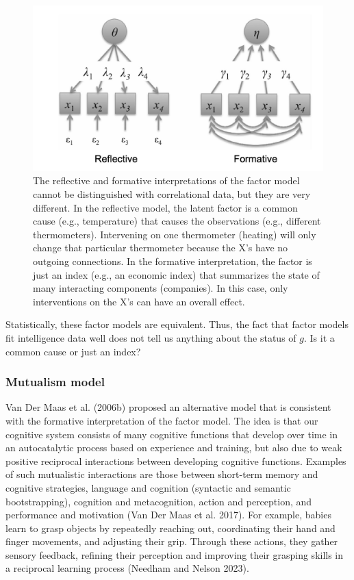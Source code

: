 \documentclass[
  a4paper,
  DIV=11,
  numbers=noendperiod]{scrreprt}
\begin{document}
\begin{figure}

{\centering \includegraphics{media/ch6/image5.jpg}

}

\caption{\label{fig-ch6-img5-old-74}The reflective and formative
interpretations of the factor model cannot be distinguished with
correlational data, but they are very different. In the reflective
model, the latent factor is a common cause (e.g., temperature) that
causes the observations (e.g., different thermometers). Intervening on
one thermometer (heating) will only change that particular thermometer
because the X's have no outgoing connections. In the formative
interpretation, the factor is just an index (e.g., an economic index)
that summarizes the state of many interacting components (companies). In
this case, only interventions on the X's can have an overall effect.}

\end{figure}

Statistically, these factor models are equivalent. Thus, the fact that
factor models fit intelligence data well does not tell us anything about
the status of \(g\). Is it a common cause or just an index?

\hypertarget{sec-Mutualism-model}{%
\subsubsection{Mutualism model}\label{sec-Mutualism-model}}

Van Der Maas et al. (2006b) proposed an alternative model that is
consistent with the formative interpretation of the factor model. The
idea is that our cognitive system consists of many cognitive functions
that develop over time in an autocatalytic process based on experience
and training, but also due to weak positive reciprocal interactions
between developing cognitive functions. Examples of such mutualistic
interactions are those between short-term memory and cognitive
strategies, language and cognition (syntactic and semantic
bootstrapping), cognition and metacognition, action and perception, and
performance and motivation (Van Der Maas et al. 2017). For example,
babies learn to grasp objects by repeatedly reaching out, coordinating
their hand and finger movements, and adjusting their grip. Through these
actions, they gather sensory feedback, refining their perception and
improving their grasping skills in a reciprocal learning process
(Needham and Nelson 2023).
\end{document}
